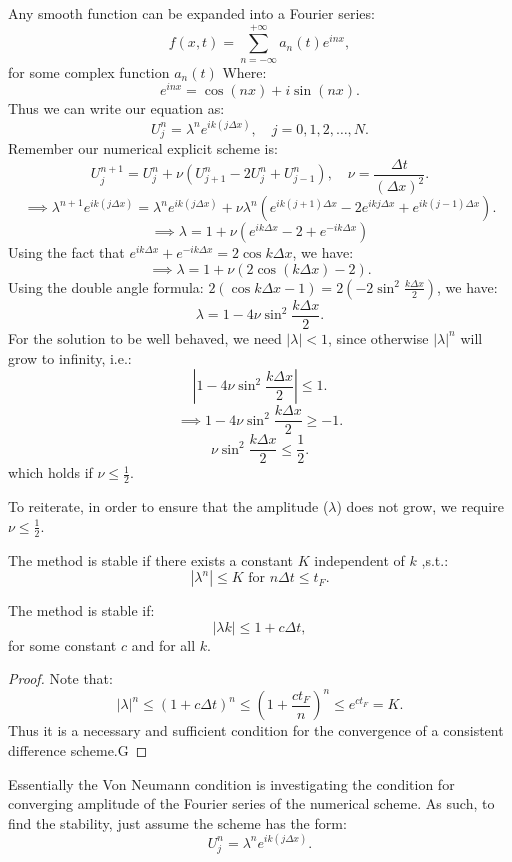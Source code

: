 \documentclass[../main/main.tex]{subfiles}
\begin{document}
Any smooth function can be expanded into a Fourier series: \[
    f(x,t) = \sum_{n=-\infty}^{+\infty} a_n(t) e^{inx}
    ,\] for some complex function $a_n(t)$ Where: \[
e^{inx} = \cos (nx) + i \sin(nx)
.\]
Thus we can write our equation as: \[
    U^n_j = \lambda^n e^{ik(j \Delta x)}, \quad j = 0,1,2,\ldots,N
.\] 
Remember our numerical explicit scheme is: \[
    U^{n+1}_j = U^n_j + \nu(U^n_{j+1}-2U^n_j+U^n_{j-1}), \quad \nu  = \frac{\Delta t}{(\Delta x)^2}
.\] \[
\implies \lambda^{n+1} e^{ik(j \Delta x)} = \lambda^n e^{ik(j\Delta x)} + \nu \lambda^n \left( e^{ik(j+1)\Delta x}-2 e^{ikj\Delta x} +e^{ik(j-1) \Delta x}\right) 
.\] \[
\implies \lambda = 1 + \nu\left( e^{ik\Delta x}-2 + e^{-ik\Delta x} \right) \]
Using the fact that $e^{ik\Delta x} + e^{-ik\Delta x} = 2\cos k\Delta x$, we have: 
\[\implies \lambda = 1 + \nu \left( 2\cos(k\Delta x) -2 \right) 
.\] Using the double angle formula: $2(\cos k\Delta x -1) = 2(-2 \sin^2 \frac{k\Delta x}{2})$, we have: \[
\lambda = 1-4\nu \sin^2 \frac{k\Delta x}{2}
.\] 
For the solution to be well behaved, we need $|\lambda| <  1$, since otherwise $|\lambda|^{n}$ will grow to infinity, i.e.: \[
\left|1-4\nu \sin^2 \frac{k\Delta x}{2}\right| \le  1
.\] \[
 \implies 1 - 4 \nu \sin^2 \frac{k\Delta x}{2} \ge -1
.\] \[
\nu \sin^2 \frac{k\Delta x}{2} \le  \frac{1}{2}
.\] which holds if $\nu\le  \frac{1}{2}$.

To reiterate, in order to ensure that the amplitude ($\lambda$) does not grow, we require $\nu \le  \frac{1}{2}$.

The method is stable if there exists a constant  $K$ independent of  $k$ ,s.t.:  \[
|\lambda^{n}| \le  K \text{ for }n \Delta t \le  t_F
.\] 

\begin{definition} The method is stable if: \[
|\lambda k| \le  1 + c\Delta t 
,\] for some constant $c$ and for all  $k$. 
\end{definition}
\begin{proof}
    Note that: \[
        |\lambda|^{n} \le  (1+c\Delta t)^{n} \le  \left( 1+ \frac{ct_F}{n} \right) ^{n} \le e^{ct_F} = K
    .\] 
    Thus it is a necessary and sufficient condition for the convergence of a consistent difference scheme.G
\end{proof}

Essentially the Von Neumann condition is investigating the condition for converging amplitude of the Fourier series of the numerical scheme. As such, to find the stability, just assume the scheme has the form: \[
    U^n_j = \lambda^n e^{ik(j\Delta x)}
.\] 
\end{document}
